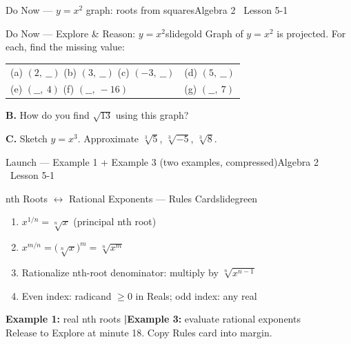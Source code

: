 \documentclass[aspectratio=169, 11pt]{beamer}
\begin{document}

\begin{frame}{Do Now --- \(y = x^2\) graph: roots from squares}{Algebra 2 \textperiodcentered\ Lesson 5-1}
\vspace{0.2cm}
\begin{projcard}{Do Now --- Explore \& Reason: \(y = x^2\)}{slidegold}
\small
Graph of \(y = x^2\) is projected. For each, find the missing value:

\vspace{0.15cm}
\begin{tabular}{ll}
(a) \((2,\ \_\_)\) \quad (b) \((3,\ \_\_)\) \quad (c) \((-3,\ \_\_)\) & \quad (d) \((5,\ \_\_)\) \\[4pt]
(e) \((\_\_,\ 4)\) \quad (f) \((\_\_,\ -16)\) & \quad (g) \((\_\_,\ 7)\)
\end{tabular}

\vspace{0.2cm}
\textbf{B.} How do you find \(\sqrt{13}\) using this graph?

\vspace{0.1cm}
\textbf{C.} Sketch \(y = x^3\). Approximate \(\sqrt[3]{5}\), \(\sqrt[3]{-5}\), \(\sqrt[3]{8}\).
\end{projcard}
\end{frame}

\begin{frame}{Launch --- Example 1 + Example 3 (two examples, compressed)}{Algebra 2 \textperiodcentered\ Lesson 5-1}
\vspace{0.1cm}
\begin{projcard}{nth Roots \(\leftrightarrow\) Rational Exponents --- Rules Card}{slidegreen}
\small
\begin{enumerate}
  \setlength{\itemsep}{1pt}
  \item \(x^{1/n} = \sqrt[n]{x}\) \quad (principal nth root)
  \item \(x^{m/n} = \bigl(\sqrt[n]{x}\bigr)^m = \sqrt[n]{x^m}\)
  \item Rationalize nth-root denominator: multiply by \(\sqrt[n]{x^{n-1}}\)
  \item Even index: radicand \(\ge 0\) in Reals; odd index: any real
\end{enumerate}

\vspace{0.1cm}
\textcolor{slideaccent}{\textbf{Example 1:}} real nth roots \quad\textbf{|}\quad \textcolor{slideaccent}{\textbf{Example 3:}} evaluate rational exponents\\[2pt]
\small Release to Explore at minute 18. Copy Rules card into margin.
\end{projcard}
\end{frame}
\end{document}
